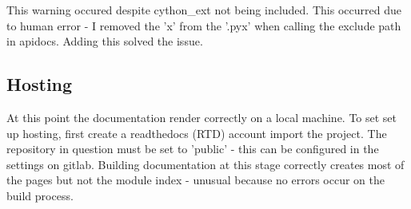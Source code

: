 \documentclass{article}
\begin{document}
This warning occured despite cython\_ext not being included. This occurred due to human error - I removed the 'x' from the '.pyx' when calling the exclude path in apidocs. Adding this solved the issue.

\subsection{Hosting}

At this point the documentation render correctly on a local machine. To set set up hosting, first create a readthedocs (RTD) account import the project. The repository in question must be set to 'public' - this can be configured in the settings on gitlab.
Building documentation at this stage correctly creates most of the pages but not the module index - unusual because no errors occur on the build process.
\end{document}
